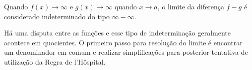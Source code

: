 Quando $f(x) \rightarrow \infty$ e $g(x) \rightarrow \infty$ quando $x \rightarrow a$, o limite da diferença $f-g$ é considerado indeterminado do tipo $\infty - \infty$.

Há uma disputa entre as funções e esse tipo de indeterminação geralmente acontece em quocientes. O primeiro passo para resolução do limite é encontrar um denominador em comum e realizar simplificações para posterior tentativa de utilização da Regra de l'Hôspital.
